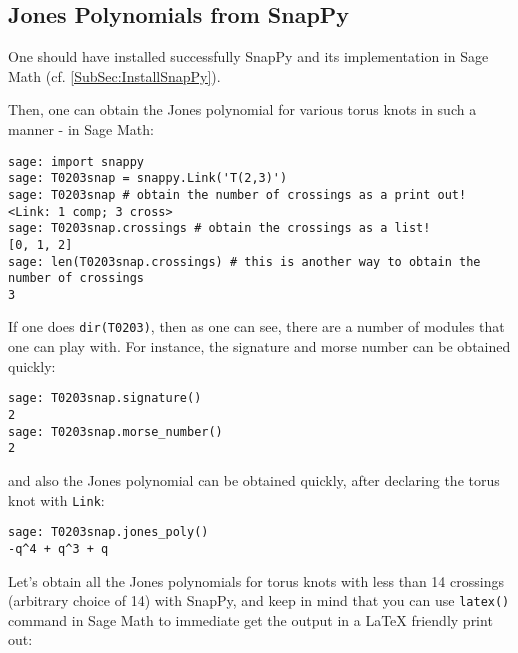 \documentclass[10pt]{amsart}
\begin{document}
\begin{multicols*}{2}
\section{Jones Polynomials from SnapPy}

One should have installed successfully SnapPy and its implementation in Sage Math (cf. \ref{SubSec:InstallSnapPy}).  

Then, one can obtain the Jones polynomial for various torus knots in such a manner - in Sage Math:
\begin{lstlisting}
sage: import snappy
sage: T0203snap = snappy.Link('T(2,3)')
sage: T0203snap # obtain the number of crossings as a print out!
<Link: 1 comp; 3 cross>
sage: T0203snap.crossings # obtain the crossings as a list!
[0, 1, 2]
sage: len(T0203snap.crossings) # this is another way to obtain the number of crossings
3
\end{lstlisting}
If one does \verb|dir(T0203)|, then as one can see, there are a number of modules that one can play with.  For instance, the signature and morse number can be obtained quickly:
\begin{lstlisting}
sage: T0203snap.signature()
2
sage: T0203snap.morse_number()
2
\end{lstlisting}
and also the Jones polynomial can be obtained quickly, after declaring the torus knot with \verb|Link|:
\begin{lstlisting}
sage: T0203snap.jones_poly()
-q^4 + q^3 + q
\end{lstlisting}

Let's obtain all the Jones polynomials for torus knots with less than 14 crossings (arbitrary choice of 14) with SnapPy, and keep in mind that you can use \verb|latex()| command in Sage Math to immediate get the output in a LaTeX friendly print out:


\end{multicols*}
\end{document}
